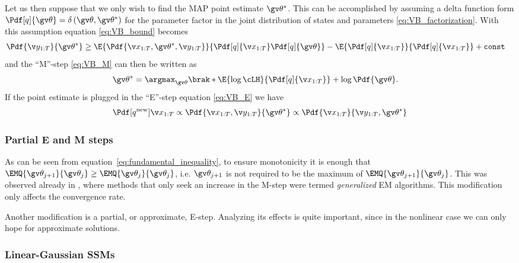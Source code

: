 Let us then suppose that we only wish to find the MAP point estimate $\Th^*$. This can be accomplished
by assuming a delta function form $\Pdf[q]{\Th}=\delta\left(\Th,\Th^*\right)$ for the parameter factor in the
joint distribution of states and parameters \eqref{eq:VB_factorization}.
With this assumption equation \eqref{eq:VB_bound} becomes
\begin{align}
	\Pdf{\Y}{\Th^*} &\geq \E{\Pdf{\X,\Th^*,\Y}}{\Pdf[q]{\X}\Pdf[q]{\Th}} - \E{\Pdf[q]{\X}}{\Pdf[q]{\X}} + \mathtt{const}
	\label{eq:VB_MAP_boundl}
\end{align}
and the ``M''-step \eqref{eq:VB_M} can then be written as
\begin{align}
	\Th^* &= \argmax_{\Th}\brak*{\E{\log\cLH}{\Pdf[q]{\X}}+\log\Pdf{\Th}}.	
\end{align}
If the point estimate is plugged in the ``E''-step equation \eqref{eq:VB_E} we have
\begin{align}
	\Pdf[q^{\text{new}}]{\X}\propto \Pdf{\X,\Y}{\Th^*} \propto \Pdf{\X}{\Y,\Th^*} 	
\end{align}

\subsubsection{Partial E and M steps}%
\label{sec:EM_partial}
As can be seen from equation~\eqref{eq:fundamental_inequality},
to ensure monotonicity it is enough that $\EMQ{\Th_{j+1}}{\Th_j}\geq \EMQ{\Th_{j}}{\Th_j}$,
i.e. $\Th_{j+1}$ is not required to be the maximum of $\EMQ{\Th_{j+1}}{\Th_j}$.
This was observed already in \textcite{Dempster1977}, where methods
that only seek an increase in the M-step were termed \emph{generalized} EM
algorithms. This modification only affects the convergence rate.

Another modification is a partial, or approximate, E-step. Analyzing
its effects is quite important, since in the nonlinear case we can only
hope for approximate solutions.  


\parencite{Lange1995,Goodwin2005}

\subsubsection{Linear-Gaussian SSMs}%
\label{sec:EM_SSM}

